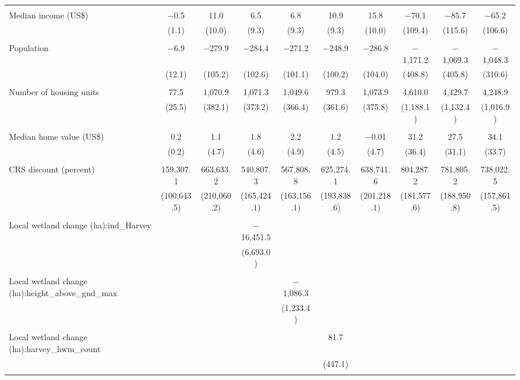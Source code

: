 \begin{tabular}{@{\extracolsep{5pt}}lccccccccc}
  & & & & & & & & & \\ 
 Median income (US\$) & $-$0.5 & 11.0 & 6.5 & 6.8 & 10.9 & 15.8 & $-$70.1 & $-$85.7 & $-$65.2 \\ 
  & (1.1) & (10.0) & (9.3) & (9.3) & (9.3) & (10.0) & (109.4) & (115.6) & (106.6) \\ 
  & & & & & & & & & \\ 
 Population & $-$6.9 & $-$279.9 & $-$284.4 & $-$271.2 & $-$248.9 & $-$286.8 & $-$1,171.2 & $-$1,069.3 & $-$1,048.3 \\ 
  & (12.1) & (105.2) & (102.6) & (101.1) & (100.2) & (104.0) & (408.8) & (405.8) & (310.6) \\ 
  & & & & & & & & & \\ 
 Number of housing units & 77.5 & 1,070.9 & 1,071.3 & 1,049.6 & 979.3 & 1,073.9 & 4,610.0 & 4,429.7 & 4,248.9 \\ 
  & (25.5) & (382.1) & (373.2) & (366.4) & (361.6) & (375.8) & (1,188.1) & (1,132.4) & (1,016.9) \\ 
  & & & & & & & & & \\ 
 Median home value (US\$) & 0.2 & 1.1 & 1.8 & 2.2 & 1.2 & $-$0.01 & 31.2 & 27.5 & 34.1 \\ 
  & (0.2) & (4.7) & (4.6) & (4.9) & (4.5) & (4.7) & (36.4) & (31.1) & (33.7) \\ 
  & & & & & & & & & \\ 
 CRS discount (percent) & 159,307.1 & 663,633.2 & 540,807.3 & 567,808.8 & 625,274.1 & 638,741.6 & 804,287.2 & 781,805.2 & 738,022.5 \\ 
  & (100,643.5) & (210,060.2) & (165,424.1) & (163,156.1) & (193,838.6) & (201,218.1) & (181,577.6) & (188,950.8) & (157,861.5) \\ 
  & & & & & & & & & \\ 
 Local wetland change (ha):ind\_Harvey &  &  & $-$16,451.5 &  &  &  &  &  &  \\ 
  &  &  & (6,693.0) &  &  &  &  &  &  \\ 
  & & & & & & & & & \\ 
 Local wetland change (ha):height\_above\_gnd\_max &  &  &  & $-$1,086.3 &  &  &  &  &  \\ 
  &  &  &  & (1,233.4) &  &  &  &  &  \\ 
  & & & & & & & & & \\ 
 Local wetland change (ha):harvey\_hwm\_count &  &  &  &  & 81.7 &  &  &  &  \\ 
  &  &  &  &  & (447.1) &  &  &  &  \\ 
  & & & & & & & & & \\ 

\end{tabular}
